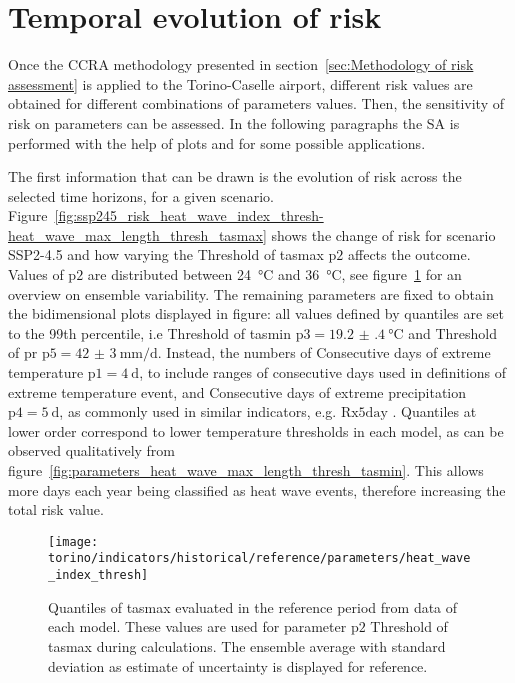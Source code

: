 \section{Temporal evolution of risk}
Once the \gls{CCRA} methodology presented in section~\ref{sec:Methodology of risk assessment} is applied to the Torino-Caselle airport, different \gls{risk} values are obtained for different combinations of parameters values.
Then, the sensitivity of risk on parameters can be assessed. In the following paragraphs the \gls{SA} is performed with the help of plots and for some possible applications.

The first information that can be drawn is the evolution of \gls{risk} across the selected time horizons, for a given scenario. Figure~\ref{fig:ssp245_risk_heat_wave_index_thresh-heat_wave_max_length_thresh_tasmax} shows the change of risk for scenario SSP2-4.5 and how varying the {Threshold of \gls{tasmax}} $\mathrm{p2}$ affects the outcome. Values of $\mathrm{p2}$ are distributed between \qty{24}{\degreeCelsius} and \qty{36}{\degreeCelsius}, see figure~\ref{fig:parameters_heat_wave_index_thresh} for an overview on ensemble variability.
The remaining parameters are fixed to obtain the bidimensional plots displayed in figure: all values defined by quantiles are set to the 99th percentile, i.e {Threshold of \gls{tasmin}} $\mathrm{p3} = \qty{19.2(4)}{\degreeCelsius}$ and {Threshold of \gls{pr}} $\mathrm{p5} = \qty{42(3)}{\milli\metre\per\day}$. Instead, the numbers of {Consecutive days of extreme temperature} $\mathrm{p1} = \qty{4}{\day}$, to include ranges of consecutive days used in definitions of extreme temperature event, and {Consecutive days of extreme precipitation} $\mathrm{p4} = \qty{5}{\day}$, as commonly used in similar indicators, e.g. $\mathrm{Rx5day}$ \cite[2208]{2021GutierrezAnnexVI}.
Quantiles at lower order correspond to lower temperature thresholds in each model, as can be observed qualitatively from figure~\ref{fig:parameters_heat_wave_max_length_thresh_tasmin}. This allows more days each year being classified as heat wave events, therefore increasing the total risk value.

\begin{figure}
  \centering
  \texttt{[image: torino/indicators/historical/reference/parameters/heat\_wave\_index\_thresh]}
  \caption{Quantiles of \gls{tasmax} evaluated in the reference period from data of each model. These values are used for parameter $\mathrm{p2}$ {Threshold of \gls{tasmax}} during calculations. The ensemble average with standard deviation as estimate of uncertainty is displayed for reference.}
  \label{fig:parameters_heat_wave_index_thresh}
\end{figure}


